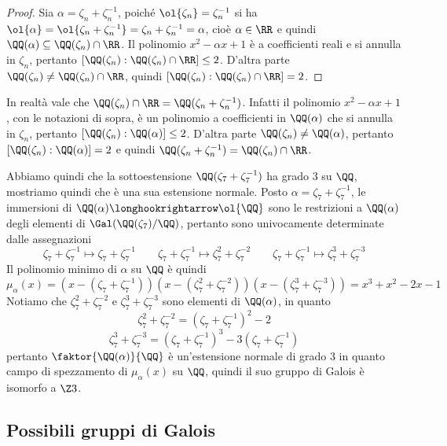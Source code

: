 \documentclass[11pt]{scrartcl}
\begin{document}
	\begin{proof}
		Sia $\alpha = \zeta_n + \zeta_n^{-1}$, poiché $\ol{\zeta_n} = \zeta_n^{-1}$
		si ha $\ol{\alpha} = \ol{\zeta_n + \zeta_n^{-1}} = \zeta_n + \zeta_n^{-1} = \alpha$,
		cioè $\alpha \in \RR$ e quindi $\QQ(\alpha) \subseteq \QQ(\zeta_n)\cap \RR$.
		Il polinomio $x^2 - \alpha x + 1$ è a coefficienti reali e si annulla in 
		$\zeta_n$, pertanto $[\QQ(\zeta_n):\QQ(\zeta_n)\cap \RR]\leq 2$. D'altra
		parte $\QQ(\zeta_n)\neq \QQ(\zeta_n)\cap \RR$, quindi 
		$[\QQ(\zeta_n):\QQ(\zeta_n)\cap \RR] = 2$.
	\end{proof}
	
	\begin{remark}
		In realtà vale che $\QQ(\zeta_n)\cap \RR = \QQ(\zeta_n + \zeta_n^{-1})$.
		Infatti il polinomio $x^2 - \alpha x + 1$, con le notazioni di sopra, 
		è un polinomio a coefficienti in $\QQ(\alpha)$ che si annulla in $\zeta_n$,
		pertanto $[\QQ(\zeta_n):\QQ(\alpha)] \leq 2$. D'altra parte $\QQ(\zeta_n)\neq \QQ(\alpha)$,
		pertanto $[\QQ(\zeta_n):\QQ(\alpha)] = 2$ e quindi 
		$\QQ(\zeta_n + \zeta_n^{-1}) = \QQ(\zeta_n)\cap \RR$.
	\end{remark}
	
	Abbiamo quindi che la sottoestensione $\QQ(\zeta_7 + \zeta_7^{-1})$ ha grado
	3 su $\QQ$, mostriamo quindi che è una sua estensione normale. Posto 
	$\alpha = \zeta_7 + \zeta_7^{-1}$, le immersioni di 
	$\QQ(\alpha) \longhookrightarrow \ol{\QQ}$ sono le restrizioni a $\QQ(\alpha)$
	degli elementi di $\Gal(\QQ(\zeta_7)/\QQ)$, pertanto sono univocamente determinate
	dalle assegnazioni 
	\[
	\zeta_7 + \zeta_7^{-1} \longmapsto \zeta_7 + \zeta_7^{-1}\qquad
	\zeta_7 + \zeta_7^{-1} \longmapsto \zeta_7^2 + \zeta_7^{-2}\qquad
	\zeta_7 + \zeta_7^{-1} \longmapsto \zeta_7^3 + \zeta_7^{-3}
	\]
	Il polinomio minimo di $\alpha$ su $\QQ$ è quindi 
	\[
	\mu_{\alpha}(x) = (x - (\zeta_7 + \zeta_7^{-1}))(x - (\zeta_7^2 + \zeta_7^{-2}))(x - (\zeta_7^3 + \zeta_7^{-3}))
	= x^3 + x^2 - 2x - 1
	\]
	Notiamo che $\zeta_7^2 + \zeta_7^{-2}$ e $\zeta_7^3 + \zeta_7^{-3}$ sono
	elementi di $\QQ(\alpha)$, in quanto
	\[
	\zeta_7^2 + \zeta_7^{-2} = (\zeta_7 + \zeta_7^{-1})^2 - 2
	\]
	\[
	\zeta_7^3 + \zeta_7^{-3} = (\zeta_7 + \zeta_7^{-1})^3 - 3(\zeta_7 + \zeta_7^{-1})
	\]
	pertanto $\faktor{\QQ(\alpha)}{\QQ}$ è un'estensione normale di grado 3 in 
	quanto campo di spezzamento di $\mu_{\alpha}(x)$ su $\QQ$,
	quindi il suo gruppo di Galois è isomorfo a $\Z3$.
	
	\newpage
	
	\subsection{Possibili gruppi di Galois}
	
\end{document}
